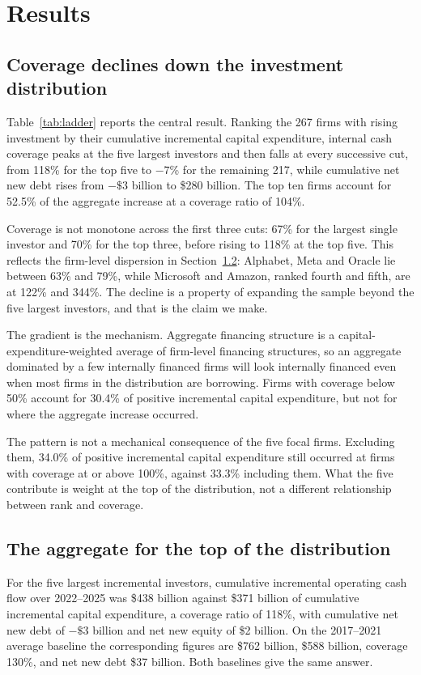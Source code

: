 \documentclass[preprint,11pt]{elsarticle}
\begin{document}
\section{Results}
\subsection{Coverage declines down the investment distribution}
Table~\ref{tab:ladder} reports the central result. Ranking the 267 firms with rising investment by
their cumulative incremental capital expenditure, internal cash coverage peaks at the five largest
investors and then falls at every successive cut, from 118\% for the top five to $-7$\% for the
remaining 217, while cumulative net new debt rises from $-\$3$ billion to \$280 billion. The top
ten firms account for 52.5\% of the aggregate increase at a coverage ratio of 104\%.

Coverage is not monotone across the first three cuts: 67\% for the largest single investor and 70\%
for the top three, before rising to 118\% at the top five. This reflects the firm-level dispersion in
Section~\ref{sec:top}: Alphabet, Meta and Oracle lie between 63\% and 79\%, while Microsoft and
Amazon, ranked fourth and fifth, are at 122\% and 344\%. The decline is a property of expanding the
sample beyond the five largest investors, and that is the claim we make.

The gradient is the mechanism. Aggregate financing structure is a capital-expenditure-weighted
average of firm-level financing structures, so an aggregate dominated by a few internally financed
firms will look internally financed even when most firms in the distribution are borrowing. Firms
with coverage below 50\% account for 30.4\% of positive incremental capital expenditure, but not for
where the aggregate increase occurred.

The pattern is not a mechanical consequence of the five focal firms. Excluding them, 34.0\% of
positive incremental capital expenditure still occurred at firms with coverage at or above 100\%,
against 33.3\% including them. What the five contribute is weight at the top of the distribution,
not a different relationship between rank and coverage.

\subsection{The aggregate for the top of the distribution}\label{sec:top}
For the five largest incremental investors, cumulative incremental operating cash flow over
2022--2025 was \$438 billion against \$371 billion of cumulative incremental capital expenditure, a
coverage ratio of 118\%, with cumulative net new debt of $-\$3$ billion and net new equity of \$2
billion. On the 2017--2021 average baseline the corresponding figures are \$762 billion, \$588
billion, coverage 130\%, and net new debt \$37 billion. Both baselines give the same answer.
\end{document}
